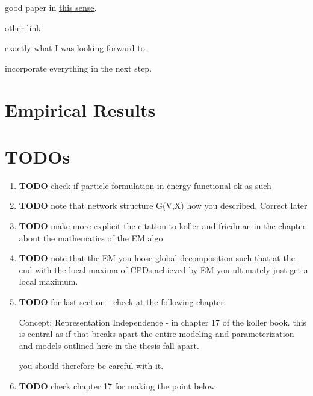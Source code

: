 \documentclass[11pt]{article}
\begin{document}
\begin{article}
\begin{enumerate}
good paper in \href{https://arxiv.org/pdf/1608.01734.pdf}{this sense}.

\href{https://scholar.google.com/scholar?q=Method\%20for\%20Computation\%20of\%20the\%20Fisher\%20Information\%20Matrix\%20in\%20the\%20Expectation\%2DMaximization\%20Algorithm\&btnG=Search\&as\_sdt=800000000001\&as\_sdtp=on}{other link}.

exactly what I was looking forward to.

incorporate everything in the next step.
\end{enumerate}


\section{Empirical Results}
\label{sec:orgc2c5c6d}



\newpage



\section{TODOs}
\label{sec:orgac04ceb}

\begin{enumerate}
\item {\bfseries\sffamily TODO} check if particle formulation in energy functional ok as such
\label{sec:org0269f5c}
\item {\bfseries\sffamily TODO} note that network structure G(V,X) how you described. Correct later
\label{sec:org0d4e674}
\item {\bfseries\sffamily TODO} make more explicit the citation to koller and friedman in the chapter about the mathematics of the EM algo
\label{sec:orgf3cda2e}
\item {\bfseries\sffamily TODO} note that the EM you loose global decomposition such that at the end with the local maxima of CPDs achieved by EM you ultimately just get a local maximum.
\label{sec:org61a6a30}
\item {\bfseries\sffamily TODO} for last section - check at the following chapter.
\label{sec:org0dcd342}

Concept: Representation Independence - in chapter 17 of the
koller book. this is central as if that breaks apart the entire
modeling and parameterization and models outlined here in the
thesis fall apart.

you should therefore be careful with it.

\item {\bfseries\sffamily TODO} check chapter 17 for making the point below
\label{sec:org45b7148}


\end{enumerate}
\end{article}
\end{document}

